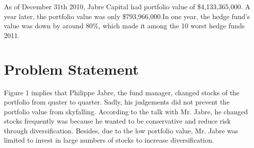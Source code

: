 \documentclass[12pt,letterpaper]{article}
\theoremstyle{definition}
\begin{document}
As of December 31th 2010, Jabre Capital had portfolio value of \$4,133,365,000. A year later, the portfolio value was only \$793,966,000.In one year, the hedge fund's value was down by around 80\%, which made it among the 10 worst hedge funds 2011.   

\section{Problem Statement}
Figure 1 implies that Philippe Jabre, the fund manager, changed stocks of the portfolio from quater to quarter. Sadly, his judgements did not prevent the portfolio value from skyfalling. According  to the talk with Mr. Jabre, he changed stocks frequently was because he wanted to be conservative and reduce risk through diversification. Besides, due to the low portfolio value, Mr. Jabre was limited to invest in large numbers of stocks to increase diversification.
\end{document}
